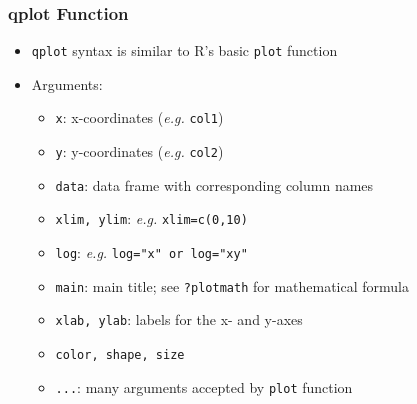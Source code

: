 \documentclass{beamer}
\newcommand{\Rfunction}[1]{{\texttt{#1}}}
\begin{document}
\begin{frame}[containsverbatim]  
	\frametitle{qplot Function}
\begin{itemize}
	\item \Rfunction{qplot} syntax is similar to R's basic \Rfunction{plot} function
	\item Arguments: 
        \begin{itemize}
        	\item \Rfunction{x}: x-coordinates (\textit{e.g.} \Rfunction{col1})
		\item \Rfunction{y}: y-coordinates (\textit{e.g.} \Rfunction{col2})
		\item \Rfunction{data}: data frame with corresponding column names
		\item \Rfunction{xlim, ylim}: \textit{e.g.} \Rfunction{xlim=c(0,10)} 
		\item \Rfunction{log}: \textit{e.g.} \Rfunction{log="x" or log="xy"}
		\item \Rfunction{main}: main title; see \Rfunction{?plotmath} for mathematical formula
		\item \Rfunction{xlab, ylab}: labels for the x- and y-axes
		\item \Rfunction{color, shape, size}
		\item \Rfunction{...}: many arguments accepted by \Rfunction{plot} function
	\end{itemize}
\end{itemize}
\end{frame}
\end{document}
